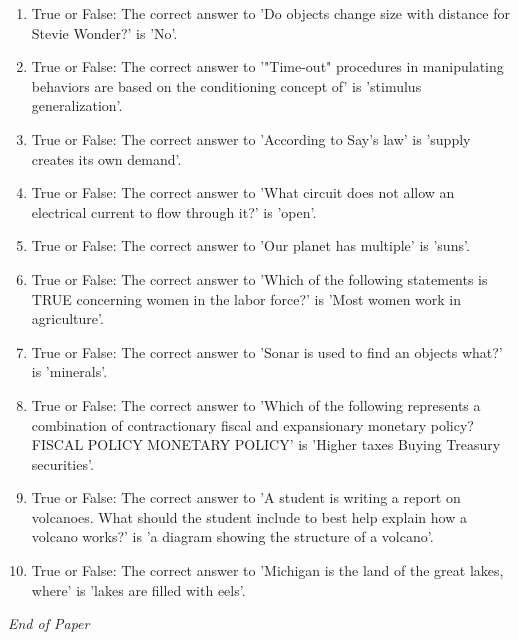 \documentclass[12pt]{article}
\begin{document}
\begin{enumerate}[label=\arabic*.]
\item True or False: The correct answer to 'Do objects change size with distance for Stevie Wonder?' is 'No'.
\item True or False: The correct answer to '"Time-out" procedures in manipulating behaviors are based on the conditioning concept of' is 'stimulus generalization'.
\item True or False: The correct answer to 'According to Say's law' is 'supply creates its own demand'.
\item True or False: The correct answer to 'What circuit does not allow an electrical current to flow through it?' is 'open'.
\item True or False: The correct answer to 'Our planet has multiple' is 'suns'.
\item True or False: The correct answer to 'Which of the following statements is TRUE concerning women in the labor force?' is 'Most women work in agriculture'.
\item True or False: The correct answer to 'Sonar is used to find an objects what?' is 'minerals'.
\item True or False: The correct answer to 'Which of the following represents a combination of contractionary fiscal and expansionary monetary policy? FISCAL POLICY MONETARY POLICY' is 'Higher taxes Buying Treasury securities'.
\item True or False: The correct answer to 'A student is writing a report on volcanoes. What should the student include to best help explain how a volcano works?' is 'a diagram showing the structure of a volcano'.
\item True or False: The correct answer to 'Michigan is the land of the great lakes, where' is 'lakes are filled with eels'.
\end{enumerate}

\vfill
\noindent\textit{End of Paper}
\end{document}

